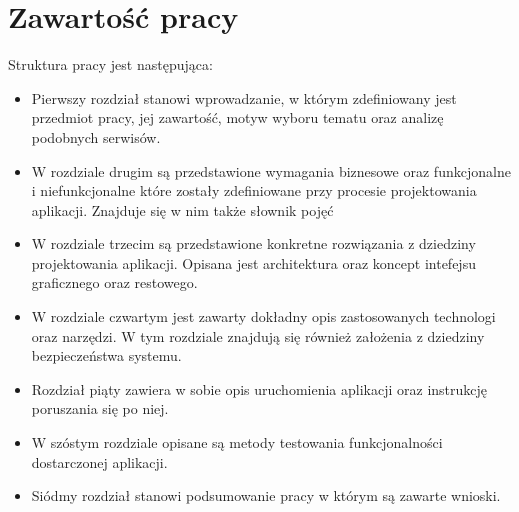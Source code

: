 \section{Zawartość pracy}
\label{sec:zawartoscPracy}
Struktura pracy jest następująca: 
\begin{itemize}
\item Pierwszy rozdział stanowi wprowadzanie, w którym zdefiniowany jest przedmiot pracy, jej zawartość, motyw wyboru tematu oraz analizę podobnych serwisów. 
\item W rozdziale drugim są przedstawione wymagania biznesowe oraz funkcjonalne i niefunkcjonalne które zostały zdefiniowane przy procesie projektowania aplikacji. Znajduje się w nim także słownik pojęć 
\item W rozdziale trzecim są przedstawione konkretne rozwiązania z dziedziny projektowania aplikacji. Opisana jest architektura oraz koncept intefejsu graficznego oraz restowego. 
\item W rozdziale czwartym jest zawarty dokładny opis zastosowanych technologi oraz narzędzi. W tym rozdziale znajdują  się również założenia z dziedziny bezpieczeństwa systemu.
\item Rozdział piąty zawiera w sobie opis uruchomienia aplikacji oraz instrukcję poruszania się po niej.
\item W szóstym rozdziale opisane są metody testowania funkcjonalności dostarczonej aplikacji. 
\item Siódmy rozdział stanowi podsumowanie pracy w którym są zawarte wnioski.
\end{itemize}


